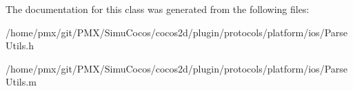 The documentation for this class was generated from the following files\+:\begin{DoxyCompactItemize}
\item 
/home/pmx/git/\+P\+M\+X/\+Simu\+Cocos/cocos2d/plugin/protocols/platform/ios/Parse\+Utils.\+h\item 
/home/pmx/git/\+P\+M\+X/\+Simu\+Cocos/cocos2d/plugin/protocols/platform/ios/Parse\+Utils.\+m\end{DoxyCompactItemize}
